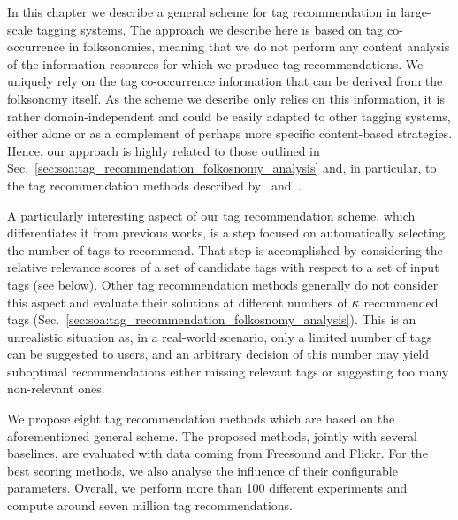 In this chapter we describe a general scheme for tag recommendation in large-scale tagging systems. The approach we describe here is based on tag co-occurrence in folksonomies, meaning that we do not perform any content analysis of the information resources for which we produce tag recommendations. We uniquely rely on the tag co-occurrence information that can be derived from the folksonomy itself.
As the scheme we describe only relies on this information, it is rather domain-independent and could be easily adapted to other tagging systems, either alone or as a complement of perhaps more specific content-based strategies. 
Hence, our approach is highly related to those outlined in Sec.~\ref{sec:soa:tag_recommendation_folkosnomy_analysis} and, in particular, to the tag recommendation methods described by~\cite{Sigurbjornsson2008} and~\cite{Garg2008}. 

A particularly interesting aspect of our tag recommendation scheme, which differentiates it from previous works, is a step focused on automatically selecting the number of tags to recommend. That step is accomplished by considering the relative relevance scores of a set of candidate tags with respect to a set of input tags (see below). Other tag recommendation methods generally do not consider this aspect and evaluate their solutions at different numbers of $\kappa$ recommended tags (Sec.~\ref{sec:soa:tag_recommendation_folkosnomy_analysis}). 
This is an unrealistic situation as, in a real-world scenario, only a limited number of tags can be suggested to users, and an arbitrary decision of this number may yield suboptimal recommendations either missing relevant tags or suggesting too many non-relevant ones.

We propose eight tag recommendation methods which are based on the aforementioned general scheme. The proposed methods, jointly with several baselines, are evaluated with data coming from Freesound and Flickr. For the best scoring methods, we also analyse the influence of their configurable parameters. Overall, we perform more than 100 different experiments and compute around seven million tag recommendations. 


